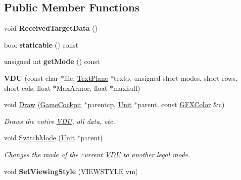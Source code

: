 \subsection*{Public Member Functions}
\begin{DoxyCompactItemize}
\item 
void {\bfseries Received\+Target\+Data} ()\hypertarget{classVDU_afa284de2e86bd248cbb29dda9fd17048}{}\label{classVDU_afa284de2e86bd248cbb29dda9fd17048}

\item 
bool {\bfseries staticable} () const \hypertarget{classVDU_a631936585850b782c4de1bf585be85ca}{}\label{classVDU_a631936585850b782c4de1bf585be85ca}

\item 
unsigned int {\bfseries get\+Mode} () const \hypertarget{classVDU_aad75ce7b4211b1159d9c7335fcd18b36}{}\label{classVDU_aad75ce7b4211b1159d9c7335fcd18b36}

\item 
{\bfseries V\+DU} (const char $\ast$file, \hyperlink{classTextPlane}{Text\+Plane} $\ast$textp, unsigned short modes, short rows, short cols, float $\ast$Max\+Armor, float $\ast$maxhull)\hypertarget{classVDU_a4969b9b597f28fb3bc599a0f84e4c03b}{}\label{classVDU_a4969b9b597f28fb3bc599a0f84e4c03b}

\item 
void \hyperlink{classVDU_ad9d5aa1c33cbacdb693a6ef5794644f1}{Draw} (\hyperlink{classGameCockpit}{Game\+Cockpit} $\ast$parentcp, \hyperlink{classUnit}{Unit} $\ast$parent, const \hyperlink{structGFXColor}{G\+F\+X\+Color} \&c)\hypertarget{classVDU_ad9d5aa1c33cbacdb693a6ef5794644f1}{}\label{classVDU_ad9d5aa1c33cbacdb693a6ef5794644f1}

\begin{DoxyCompactList}\small\item\em Draws the entire \hyperlink{classVDU}{V\+DU}, all data, etc. \end{DoxyCompactList}\item 
void \hyperlink{classVDU_af16602681296493a3b42a3c2c407a866}{Switch\+Mode} (\hyperlink{classUnit}{Unit} $\ast$parent)\hypertarget{classVDU_af16602681296493a3b42a3c2c407a866}{}\label{classVDU_af16602681296493a3b42a3c2c407a866}

\begin{DoxyCompactList}\small\item\em Changes the mode of the current \hyperlink{classVDU}{V\+DU} to another legal mode. \end{DoxyCompactList}\item 
void {\bfseries Set\+Viewing\+Style} (V\+I\+E\+W\+S\+T\+Y\+LE vm)\hypertarget{classVDU_a217aa82873c65cc04d47474618f33c00}{}\label{classVDU_a217aa82873c65cc04d47474618f33c00}


\end{DoxyCompactItemize}
